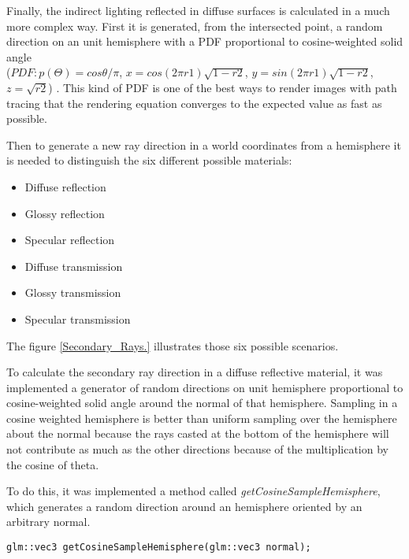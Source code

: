 \par
Finally, the indirect lighting reflected in diffuse surfaces is calculated in a much more complex way.
First it is generated, from the intersected point, a random direction on an unit hemisphere with a PDF proportional to cosine-weighted solid angle\\
($PDF: p(\Theta) = cos\theta / \pi$,
$x = cos(2\pi r1)\sqrt{1-r2}$,
$y = sin(2\pi r1)\sqrt{1-r2}$,
$z = \sqrt{r2}$)
.
This kind of PDF is one of the best ways to render images with path tracing that the rendering equation converges to the expected value as fast as possible.

Then to generate a new ray direction in a world coordinates from a hemisphere it is needed to distinguish the six different possible materials:

\begin{itemize}
	\item Diffuse reflection
	\item Glossy reflection
	\item Specular reflection
	\item Diffuse transmission
	\item Glossy transmission
	\item Specular transmission
\end{itemize}

\par
The figure \ref{Secondary_Rays.} illustrates those six possible scenarios.

To calculate the secondary ray direction in a diffuse reflective material, it was implemented a generator of random directions on unit hemisphere proportional to cosine-weighted solid angle around the normal of that hemisphere.
Sampling in a cosine weighted hemisphere is better than uniform sampling over the hemisphere about the normal because the rays casted at the bottom of the hemisphere will not contribute as much as the other directions because of the multiplication by the cosine of theta.

\par
To do this, it was implemented a method called \textit{getCosineSampleHemisphere}, which generates a random direction around an hemisphere oriented by an arbitrary normal.

\begin{lstlisting}[caption={Method in Shader which generates a random direction in an hemisphere.}, captionpos=b, label=Shader]
glm::vec3 getCosineSampleHemisphere(glm::vec3 normal);
\end{lstlisting}

